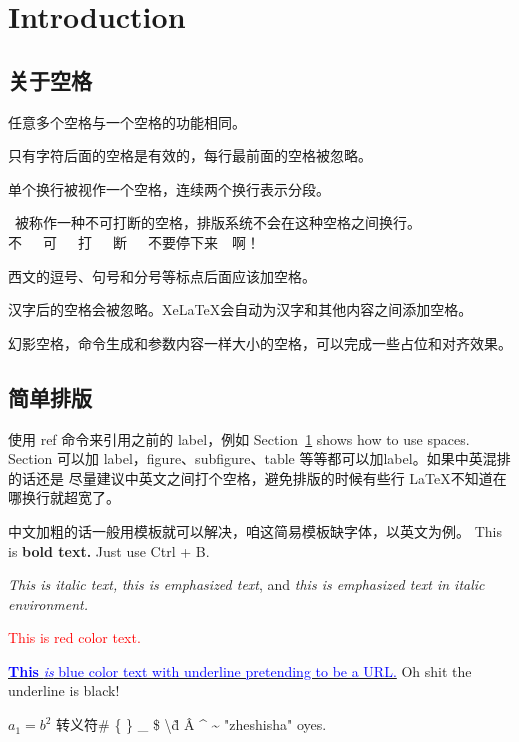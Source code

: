 \chapter{Introduction}\label{chap:1}
\section{关于空格}\label{空格} 

任意多个空格与一个空格的功能相同。

只有字符后面的空格是有效的，每行最前面的空格被忽略。

单个换行被视作一个空格，连续两个换行表示分段。

~被称作一种不可打断的空格，排版系统不会在这种空格之间换行。不~~~可~~~打~~~断~~~不要停下来~~啊！

西文的逗号、句号和分号等标点后面应该加空格。

汉字后的空格会被忽略。XeLaTeX会自动为汉字和其他内容之间添加空格。

幻影空格，命令\phantom{参数}生成和参数内容一样大小的空格，可以完成一些占位和对齐效果。

\section{简单排版}
使用 ref 命令来引用之前的 label，例如 Section~\ref{chap:1} shows how to use spaces.
Section 可以加 label，figure、subfigure、table 等等都可以加label。如果中英混排的话还是
尽量建议中英文之间打个空格，避免排版的时候有些行 \LaTeX 不知道在哪换行就超宽了。

中文加粗的话一般用模板就可以解决，咱这简易模板缺字体，以英文为例。
This is \textbf{bold text.} Just use Ctrl + B.

\textit{This is italic text,} \emph{this is emphasized text},
and \textit{this is \emph{emphasized text} in italic environment.}

\textcolor{red}{This is red color text.} %

\underline{\textcolor{blue}{\textbf{This} \textit{is} blue color text with underline 
pretending to be a URL.}} Oh shit the underline is black!

$a_1=b^2$
转义符\# \{ \} \_ \$ \textbackslash \~{d} \^{A} \^{} \~{}
"zheshisha"\cite{han2019three} oyes.

